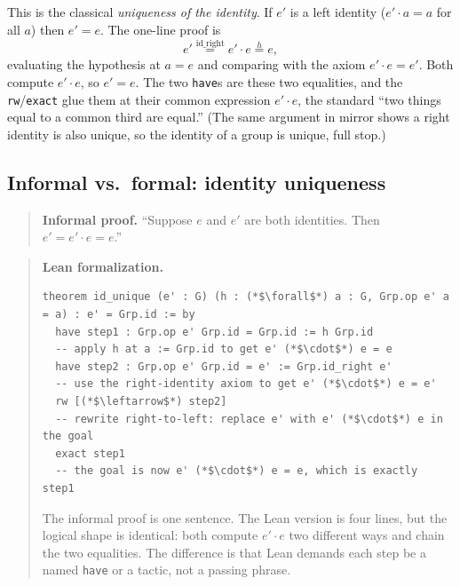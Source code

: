\begin{mathreading}

This is the classical \emph{uniqueness of the identity}. If \(e'\) is a left identity (\(e'\cdot a = a\) for all \(a\)) then \(e' = e\). The one-line proof is \[
e' \overset{\text{id\_right}}{=} e' \cdot e \overset{h}{=} e,
\] evaluating the hypothesis at \(a = e\) and comparing with the axiom \(e'\cdot e
= e'\). Both compute \(e' \cdot e\), so \(e' = e\). The two \texttt{have}s are these two equalities, and the \texttt{rw}/\texttt{exact} glue them at their common expression \(e'\cdot
e\), the standard ``two things equal to a common third are equal.'' (The same argument in mirror shows a right identity is also unique, so the identity of a group is unique, full stop.)

\end{mathreading}

\subsection{Informal vs.~formal: identity uniqueness}\label{sec:08-group-theorems:02-theorem-1:2}

\begin{quote}
\textbf{Informal proof.} ``Suppose \(e\) and \(e'\) are both identities. Then \(e' = e' \cdot e = e\).''
\end{quote}

\begin{quote}
\textbf{Lean formalization.}

\begin{lstlisting}
theorem id_unique (e' : G) (h : (*$\forall$*) a : G, Grp.op e' a = a) : e' = Grp.id := by
  have step1 : Grp.op e' Grp.id = Grp.id := h Grp.id
  -- apply h at a := Grp.id to get e' (*$\cdot$*) e = e
  have step2 : Grp.op e' Grp.id = e' := Grp.id_right e'
  -- use the right-identity axiom to get e' (*$\cdot$*) e = e'
  rw [(*$\leftarrow$*) step2]
  -- rewrite right-to-left: replace e' with e' (*$\cdot$*) e in the goal
  exact step1
  -- the goal is now e' (*$\cdot$*) e = e, which is exactly step1
\end{lstlisting}

The informal proof is one sentence. The Lean version is four lines, but the logical shape is identical: both compute \(e' \cdot e\) two different ways and chain the two equalities. The difference is that Lean demands each step be a named \texttt{have} or a tactic, not a passing phrase.
\end{quote}

